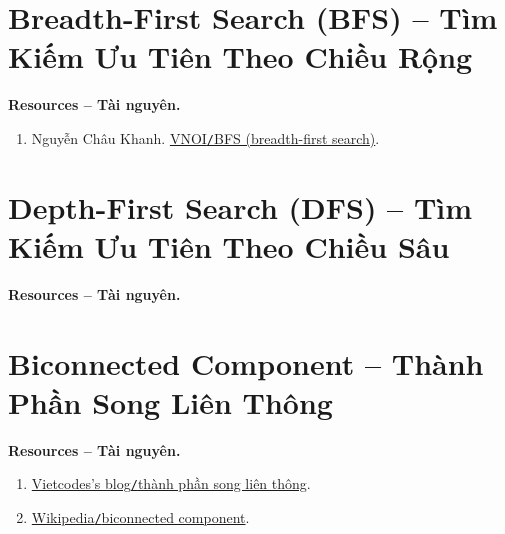 \documentclass{article}
\begin{document}

\section{Breadth-First Search (BFS) -- Tìm Kiếm Ưu Tiên Theo Chiều Rộng}
\textbf{\textsf{Resources -- Tài nguyên.}}
\begin{enumerate}
    \item {\sc Nguyễn Châu Khanh}. \href{https://wiki.vnoi.info/algo/graph-theory/breadth-first-search.md}{VNOI{\tt/}BFS (breadth-first search)}.
\end{enumerate}


\section{Depth-First Search (DFS) -- Tìm Kiếm Ưu Tiên Theo Chiều Sâu}
\textbf{\textsf{Resources -- Tài nguyên.}}



\section{Biconnected Component -- Thành Phần Song Liên Thông}
\textbf{\textsf{Resources -- Tài nguyên.}}
\begin{enumerate}
    \item \href{https://blog.vietcodes.com/algo/biconnect}{Vietcodes's blog{\tt/}thành phần song liên thông}.

    \item \href{https://en.wikipedia.org/wiki/Biconnected_component}{Wikipedia{\tt/}biconnected component}.
\end{enumerate}
\end{document}
